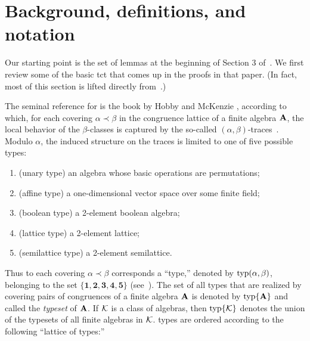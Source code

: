 

\section{Background, definitions, and notation}
\label{sec:defin-notat}
Our starting point is the set of lemmas at the beginning of Section 3 of~\cite{Freese:2009}.
We first review some of the basic \ac{tct}
that comes up in the proofs in that paper. (In fact, most of this section
is lifted directly from~\cite[Section~2]{Freese:2009}.)

The seminal reference for \tct is the book by Hobby and McKenzie
\cite{HM:1988}, according to which,
for each covering $\alpha \prec \beta$ in the congruence lattice of a finite
algebra $\mathbf{A}$, the local behavior of the $\beta$-classes is captured by the
so-called $(\alpha, \beta)$-traces~\cite[Def.~2.15]{HM:1988}.
Modulo $\alpha$, the induced structure on the traces is limited to one
of five possible types:

\begin{enumerate}[{\bf 1}]
\item  (unary type) an algebra whose basic operations are permutations;
\item  (affine type) a one-dimensional vector space over some finite field;
\item  (boolean type) a 2-element boolean algebra;
\item  (lattice type) a 2-element lattice;
\item  (semilattice type) a 2-element semilattice.
\end{enumerate}

Thus to each covering $\alpha \prec \beta$
corresponds a ``\tct type,'' denoted by $\operatorname{typ}(\alpha, \beta)$,
belonging to the set
$\{\mathbf{1},\mathbf{2},\mathbf{3},\mathbf{4},\mathbf{5}\}$
(see~\cite[Def.~5.1]{HM:1988}).
The set of all \tct types that are realized by covering pairs of congruences of a
finite algebra $\mathbf{A}$ is denoted by $\operatorname{typ}\{\mathbf{A}\}$
and called the \emph{typeset} of $\mathbf{A}$.
If $\mathcal{K}$ is a class of algebras, then $\operatorname{typ}\{\mathcal{K}\}$ denotes the union of the typesets of all finite algebras in $\mathcal{K}$.
\tct types are ordered according to the following ``lattice of types:''

